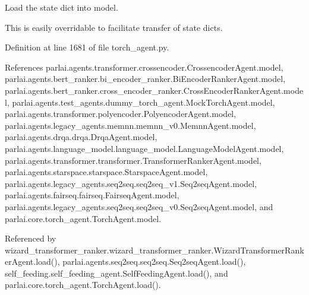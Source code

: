 \begin{DoxyVerb}Load the state dict into model.

This is easily overridable to facilitate transfer of state dicts.
\end{DoxyVerb}
 

Definition at line 1681 of file torch\+\_\+agent.\+py.



References parlai.\+agents.\+transformer.\+crossencoder.\+Crossencoder\+Agent.\+model, parlai.\+agents.\+bert\+\_\+ranker.\+bi\+\_\+encoder\+\_\+ranker.\+Bi\+Encoder\+Ranker\+Agent.\+model, parlai.\+agents.\+bert\+\_\+ranker.\+cross\+\_\+encoder\+\_\+ranker.\+Cross\+Encoder\+Ranker\+Agent.\+model, parlai.\+agents.\+test\+\_\+agents.\+dummy\+\_\+torch\+\_\+agent.\+Mock\+Torch\+Agent.\+model, parlai.\+agents.\+transformer.\+polyencoder.\+Polyencoder\+Agent.\+model, parlai.\+agents.\+legacy\+\_\+agents.\+memnn.\+memnn\+\_\+v0.\+Memnn\+Agent.\+model, parlai.\+agents.\+drqa.\+drqa.\+Drqa\+Agent.\+model, parlai.\+agents.\+language\+\_\+model.\+language\+\_\+model.\+Language\+Model\+Agent.\+model, parlai.\+agents.\+transformer.\+transformer.\+Transformer\+Ranker\+Agent.\+model, parlai.\+agents.\+starspace.\+starspace.\+Starspace\+Agent.\+model, parlai.\+agents.\+legacy\+\_\+agents.\+seq2seq.\+seq2seq\+\_\+v1.\+Seq2seq\+Agent.\+model, parlai.\+agents.\+fairseq.\+fairseq.\+Fairseq\+Agent.\+model, parlai.\+agents.\+legacy\+\_\+agents.\+seq2seq.\+seq2seq\+\_\+v0.\+Seq2seq\+Agent.\+model, and parlai.\+core.\+torch\+\_\+agent.\+Torch\+Agent.\+model.



Referenced by wizard\+\_\+transformer\+\_\+ranker.\+wizard\+\_\+transformer\+\_\+ranker.\+Wizard\+Transformer\+Ranker\+Agent.\+load(), parlai.\+agents.\+seq2seq.\+seq2seq.\+Seq2seq\+Agent.\+load(), self\+\_\+feeding.\+self\+\_\+feeding\+\_\+agent.\+Self\+Feeding\+Agent.\+load(), and parlai.\+core.\+torch\+\_\+agent.\+Torch\+Agent.\+load().

